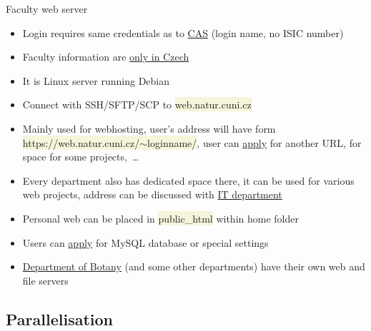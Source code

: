\documentclass[compress, ucs, xelatex, 11pt, xcolor=svgnames, aspectratio=169,
	hyperref={
		bookmarks=true,
		unicode=true,
		colorlinks=true,
		pdftitle={Linux, command line and MetaCentrum},
		plainpages=false,
		pdfauthor={Vojtech Zeisek},
		pdfsubject={Course about use of Linux command line, writing shell scripts and using MetaCentrum of CESNET},
		pdfcreator={XeLaTeX},
		pdfkeywords={Linux, GNU, BASH, shell, command line, MetaCentrum},
		linkcolor=DarkRed, %
		anchorcolor=DarkBlue, %
		citecolor=Indigo, %
		filecolor=NavyBlue, %
		menucolor=DarkMagenta, %
		urlcolor=DarkBlue, %
		pdftex},
	url={hyphens, lowtilde} %
	]{beamer}
\renewcommand{\texttt}[1]{\colorbox{Beige}{{\ttfamily #1}}}
\begin{document}
\begin{frame}{Faculty web server}
	\begin{itemize}
		\item Login requires same credentials as to \href{https://cas.cuni.cz/}{CAS} (login name, no ISIC number)
		\item Faculty information are \href{https://www.natur.cuni.cz/fakulta/cit/web-aplikace/webhosting}{only in Czech}
		\item It is Linux server running Debian
		\item Connect with SSH/SFTP/SCP to \texttt{web.natur.cuni.cz}
		\item Mainly used for webhosting, user's address will have form \texttt{https://web.natur.cuni.cz/$\sim$loginname/}, user can \href{https://helpdesk.natur.cuni.cz/servlet/HelpdeskDynamic?eid=Rozcestnik}{apply} for another URL, for space for some projects,~\ldots
		\item Every department also has dedicated space there, it can be used for various web projects, address can be discussed with \href{https://www.natur.cuni.cz/fakulta/cit/lide}{IT department}
		\item Personal web can be placed in \texttt{public\_html} within home folder
		\item Users can \href{https://helpdesk.natur.cuni.cz/servlet/HelpdeskDynamic?eid=Rozcestnik}{apply} for MySQL database or special settings
		\item \href{https://www.natur.cuni.cz/biology/botany/working-information/servers-webs-computers/}{Department of Botany} (and some other departments) have their own web and file servers
	\end{itemize}
\end{frame}

\subsection{Parallelisation}
\end{document}

